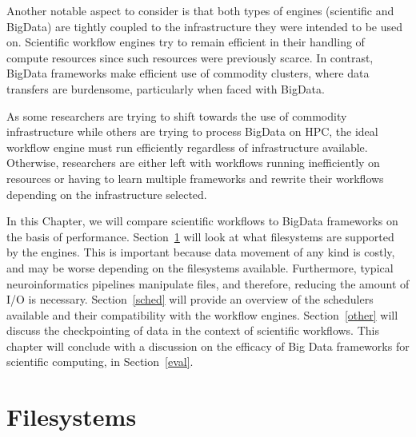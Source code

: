 \documentclass{report}
\begin{document}
        Another notable aspect to consider is that both types of engines 
        (scientific and BigData) are tightly coupled to the infrastructure
        they were intended to be used on. Scientific workflow engines
        try to remain efficient in their handling of compute resources since such
        resources were previously scarce. In contrast, BigData frameworks 
        make efficient use of commodity clusters, where data transfers are 
        burdensome, particularly when faced with BigData.

        As some researchers are trying to shift towards the use of commodity 
        infrastructure while others are trying to process BigData on HPC, the 
        ideal workflow engine must run efficiently regardless of 
        infrastructure available. Otherwise, researchers are either left with
        workflows running inefficiently on resources or having to learn 
        multiple frameworks and rewrite their workflows depending on the 
        infrastructure selected.
 
        In this Chapter, we will compare scientific
        workflows to BigData frameworks on the basis of performance. 
        Section~\ref{fs} will look at what filesystems are supported by the 
        engines. This is important because data movement of any kind is costly,
        and may be worse depending on the filesystems available. Furthermore, 
        typical neuroinformatics pipelines manipulate files, and therefore, 
        reducing the amount of I/O is necessary.
        Section~\ref{sched} will provide an overview of the schedulers 
        available and their compatibility with the workflow engines. 
        Section~\ref{other} will discuss the checkpointing of data in the context
        of scientific workflows. This chapter will conclude with a discussion
        on the efficacy of Big Data frameworks for scientific computing, in
        Section~\ref{eval}.
        
 
        \section{Filesystems}\label{fs}
            
\end{document}
